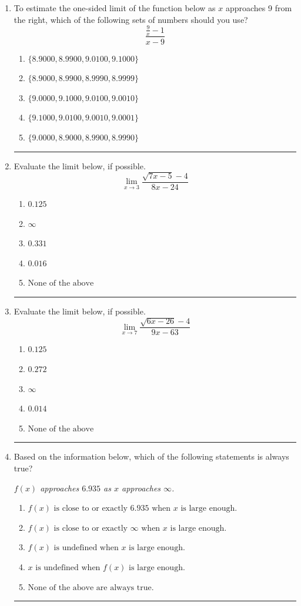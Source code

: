 \documentclass[14pt]{extbook}
\newcommand{\litem}[1]{\item#1\hspace*{-1cm}\rule{\textwidth}{0.4pt}}
\begin{document}
\begin{enumerate}
{\begin{enumerate}[label=\Alph*.]
\end{enumerate} }
\litem{
To estimate the one-sided limit of the function below as $x$ approaches 9 from the right, which of the following sets of numbers should you use?\[ \frac{\frac{9}{x} - 1}{x - 9} \]\begin{enumerate}[label=\Alph*.]
\item \( \{ 8.9000, 8.9900, 9.0100, 9.1000 \} \)
\item \( \{ 8.9000, 8.9900, 8.9990, 8.9999 \} \)
\item \( \{ 9.0000, 9.1000, 9.0100, 9.0010 \} \)
\item \( \{ 9.1000, 9.0100, 9.0010, 9.0001 \} \)
\item \( \{ 9.0000, 8.9000, 8.9900, 8.9990 \} \)

\end{enumerate} }
\litem{
Evaluate the limit below, if possible.\[ \lim_{x \rightarrow 3} \frac{\sqrt{7x - 5} - 4}{8x - 24} \]\begin{enumerate}[label=\Alph*.]
\item \( 0.125 \)
\item \( \infty \)
\item \( 0.331 \)
\item \( 0.016 \)
\item \( \text{None of the above} \)

\end{enumerate} }
\litem{
Evaluate the limit below, if possible.\[ \lim_{x \rightarrow 7} \frac{\sqrt{6x - 26} - 4}{9x - 63} \]\begin{enumerate}[label=\Alph*.]
\item \( 0.125 \)
\item \( 0.272 \)
\item \( \infty \)
\item \( 0.014 \)
\item \( \text{None of the above} \)

\end{enumerate} }
\litem{
Based on the information below, which of the following statements is always true?
\begin{center}
    \textit{ $f(x)$ approaches $6.935$ as $x$ approaches $\infty$. }
\end{center}
\begin{enumerate}[label=\Alph*.]
\item \( f(x) \text{ is close to or exactly } 6.935 \text{ when } x \text{ is large enough}. \)
\item \( f(x) \text{ is close to or exactly } \infty \text{ when } x \text{ is large enough}. \)
\item \( f(x) \text{ is undefined when } x \text{ is large enough}. \)
\item \( x \text{ is undefined when } f(x) \text{ is large enough}. \)
\item \( \text{None of the above are always true.} \)


\end{enumerate}}
\end{enumerate}
\end{document}
